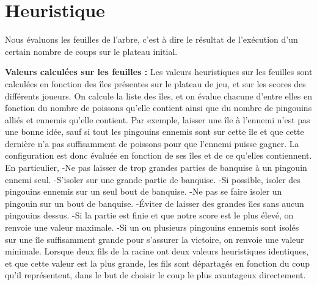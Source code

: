 \documentclass{report}
\begin{document}
\section{Heuristique}
Nous évaluons les feuilles de l'arbre, c'est à dire le résultat de l'exécution d'un certain nombre de coups sur le plateau initial.
\newline

\vspace{0.3cm}
\textbf{Valeurs calculées sur les feuilles :}
\newline
Les valeurs heuristiques sur les feuilles sont calculées en fonction des îles présentes sur le plateau de jeu, et sur les scores des différents joueurs.
\newline
On calcule la liste des îles, et on évalue chacune d'entre elles en fonction du nombre de poissons qu'elle contient ainsi que du nombre de pingouins alliés et ennemis qu'elle contient.
\newline
Par exemple, laisser une île à l'ennemi n'est pas une bonne idée, sauf si tout les pingouins ennemis sont sur cette île et que cette dernière n'a pas suffisamment de poissons pour que l'ennemi puisse gagner.
\newline 
La configuration est donc évaluée en fonction de ses îles et de ce qu'elles contiennent.
\newline 
En particulier,
\newline
-Ne pas laisser de trop grandes parties de banquise à un pingouin ennemi seul.
\newline
-S'isoler sur une grande partie de banquise. 
\newline
-Si possible, isoler des pingouins ennemis sur un seul bout de banquise.
\newline
-Ne pas se faire isoler un pingouin sur un bout de banquise.
\newline
-Éviter de laisser des grandes îles sans aucun pingouins dessus. 
\newline
-Si la partie est finie et que notre score est le plus élevé, on renvoie une valeur maximale.
\newline
-Si un ou plusieurs pingouins ennemis sont isolés sur une île suffisamment grande pour s'assurer la victoire, on renvoie une valeur minimale.
\newline
\newline
Lorsque deux fils de la racine ont deux valeurs heuristiques identiques, et que cette valeur est la plus grande, les fils sont départagés en fonction du coup qu'il représentent, dans le but de choisir le coup le plus avantageux directement. 
\vspace{0.3cm}
\end{document}
